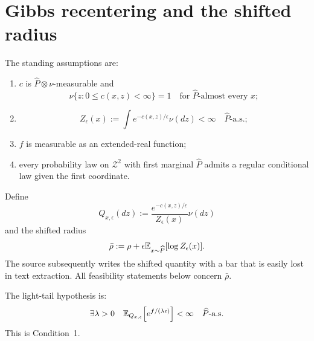\section{Gibbs recentering and the shifted radius}
The standing assumptions are:
\begin{enumerate}[label=(\roman*),leftmargin=2em]
\item $c$ is $\widehat P\otimes\nu$-measurable and
\[
 \nu\{z:0\le c(x,z)<\infty\}=1
 \quad\text{for }\widehat P\text{-almost every }x;
\]
\item
\[
 Z_\epsilon(x):=\int e^{-c(x,z)/\epsilon}\nu(dz)<\infty
 \quad\widehat P\text{-a.s.};
\]
\item $f$ is measurable as an extended-real function;
\item every probability law on $\mathcal Z^2$ with first marginal $\widehat P$ admits a regular conditional law given the first coordinate.
\end{enumerate}
Define
\begin{equation}\label{eq:WGX-Q}
 Q_{x,\epsilon}(dz)
 :=\frac{e^{-c(x,z)/\epsilon}}{Z_\epsilon(x)}\nu(dz)
\end{equation}
and the shifted radius
\begin{equation}\label{eq:WGX-rhobar}
 \bar\rho
 :=\rho+\epsilon\mathbb{E}_{x\sim\widehat P}[\log Z_\epsilon(x)].
\end{equation}
The source subsequently writes the shifted quantity with a bar that is easily lost in text extraction.  All feasibility statements below concern $\bar\rho$.

The light-tail hypothesis is:
\begin{equation}\label{eq:WGX-condition1}
 \exists\lambda>0\quad
 \mathbb{E}_{Q_{x,\epsilon}}\!\left[e^{f/(\lambda\epsilon)}\right]<\infty
 \quad\widehat P\text{-a.s.}
\end{equation}
This is Condition~1.

